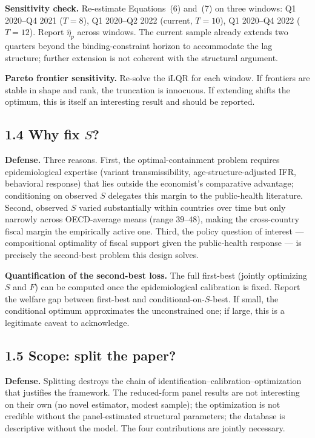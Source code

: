 \documentclass[11pt,a4paper]{article}
\begin{document}
\textbf{Sensitivity check.} Re-estimate Equations~(6) and~(7) on three windows: Q1 2020--Q4 2021 ($T=8$), Q1 2020--Q2 2022 (current, $T=10$), Q1 2020--Q4 2022 ($T=12$). Report $\hat\eta_p$ across windows. The current sample already extends two quarters beyond the binding-constraint horizon to accommodate the lag structure; further extension is not coherent with the structural argument.

\textbf{Pareto frontier sensitivity.} Re-solve the iLQR for each window. If frontiers are stable in shape and rank, the truncation is innocuous. If extending shifts the optimum, this is itself an interesting result and should be reported.

\subsection*{1.4 Why fix $S$?}

\textbf{Defense.} Three reasons. First, the optimal-containment problem requires epidemiological expertise (variant transmissibility, age-structure-adjusted IFR, behavioral response) that lies outside the economist's comparative advantage; conditioning on observed $S$ delegates this margin to the public-health literature. Second, observed $S$ varied substantially within countries over time but only narrowly across OECD-average means (range $39$--$48$), making the cross-country fiscal margin the empirically active one. Third, the policy question of interest --- compositional optimality of fiscal support given the public-health response --- is precisely the second-best problem this design solves.

\textbf{Quantification of the second-best loss.} The full first-best (jointly optimizing $S$ and $F$) can be computed once the epidemiological calibration is fixed. Report the welfare gap between first-best and conditional-on-$S$-best. If small, the conditional optimum approximates the unconstrained one; if large, this is a legitimate caveat to acknowledge.

\subsection*{1.5 Scope: split the paper?}

\textbf{Defense.} Splitting destroys the chain of identification--calibration--optimization that justifies the framework. The reduced-form panel results are not interesting on their own (no novel estimator, modest sample); the optimization is not credible without the panel-estimated structural parameters; the database is descriptive without the model. The four contributions are jointly necessary.
\end{document}
